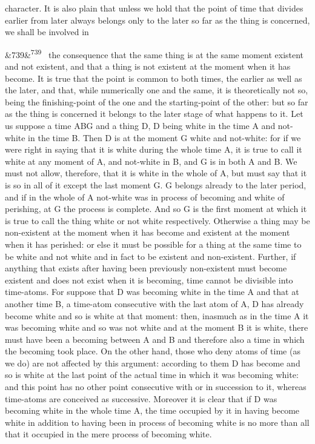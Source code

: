\documentclass[12pt]{article}
\newcommand{\para}[1][]{\par\noindent\ifx&#1&\else\textsuperscript{\footnotesize #1}~\fi}
\begin{document}
character. It is also plain that unless we hold that the point of time that divides earlier from later always belongs only to the later so far as the thing is concerned, we shall be involved in

\para[739] the consequence that the same thing is at the same moment existent and not existent, and that a thing is not existent at the moment when it has become. It is true that the point is common to both times, the earlier as well as the later, and that, while numerically one and the same, it is theoretically not so, being the finishing-point of the one and the starting-point of the other: but so far as the thing is concerned it belongs to the later stage of what happens to it. Let us suppose a time ABG and a thing D, D being white in the time A and not-white in the time B. Then D is at the moment G white and not-white: for if we were right in saying that it is white during the whole time A, it is true to call it white at any moment of A, and not-white in B, and G is in both A and B. We must not allow, therefore, that it is white in the whole of A, but must say that it is so in all of it except the last moment G. G belongs already to the later period, and if in the whole of A not-white was in process of becoming and white of perishing, at G the process is complete. And so G is the first moment at which it is true to call the thing white or not white respectively. Otherwise a thing may be non-existent at the moment when it has become and existent at the moment when it has perished: or else it must be possible for a thing at the same time to be white and not white and in fact to be existent and non-existent. Further, if anything that exists after having been previously non-existent must become existent and does not exist when it is becoming, time cannot be divisible into time-atoms. For suppose that D was becoming white in the time A and that at another time B, a time-atom consecutive with the last atom of A, D has already become white and so is white at that moment: then, inasmuch as in the time A it was becoming white and so was not white and at the moment B it is white, there must have been a becoming between A and B and therefore also a time in which the becoming took place. On the other hand, those who deny atoms of time (as we do) are not affected by this argument: according to them D has become and so is white at the last point of the actual time in which it was becoming white: and this point has no other point consecutive with or in succession to it, whereas time-atoms are conceived as successive. Moreover it is clear that if D was becoming white in the whole time A, the time occupied by it in having become white in addition to having been in process of becoming white is no more than all that it occupied in the mere process of becoming white.
\end{document}
